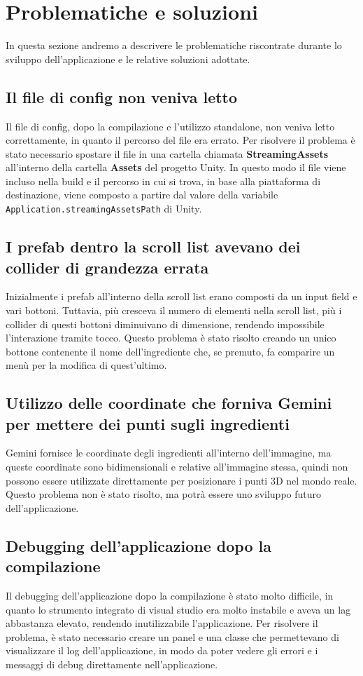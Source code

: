 \section{Problematiche e soluzioni}
In questa sezione andremo a descrivere le problematiche riscontrate durante lo sviluppo dell'applicazione e le relative soluzioni adottate.
\subsection{Il file di config non veniva letto}
Il file di config, dopo la compilazione e l'utilizzo standalone, non veniva letto correttamente, in quanto il percorso del file era errato. Per risolvere il problema è stato necessario spostare il file in una cartella chiamata \textbf{StreamingAssets} all'interno della cartella \textbf{Assets} del progetto Unity. In questo modo il file viene incluso nella build e il percorso in cui si trova, in base alla piattaforma di destinazione, viene composto a partire dal valore della variabile \texttt{Application.streamingAssetsPath} di Unity.

\subsection{I prefab dentro la scroll list avevano dei collider di grandezza errata}
Inizialmente i prefab all'interno della scroll list erano composti da un input field e vari bottoni. Tuttavia, più cresceva il numero di elementi nella scroll list, più i collider di questi bottoni diminuivano di dimensione, rendendo impossibile l'interazione tramite tocco. Questo problema è stato risolto creando un unico bottone contenente il nome dell'ingrediente che, se premuto, fa comparire un menù per la modifica di quest'ultimo.
\subsection{Utilizzo delle coordinate che forniva Gemini per mettere dei punti sugli ingredienti}
Gemini fornisce le coordinate degli ingredienti all'interno dell'immagine, ma queste coordinate sono bidimensionali e relative all'immagine stessa, quindi non possono essere utilizzate direttamente per posizionare i punti 3D nel mondo reale. Questo problema non è stato risolto, ma potrà essere uno sviluppo futuro dell'applicazione.

\subsection{Debugging dell'applicazione dopo la compilazione}
Il debugging dell'applicazione dopo la compilazione è stato molto difficile, in quanto lo strumento integrato di visual studio era molto instabile e aveva un lag abbastanza elevato, rendendo inutilizzabile l'applicazione. Per risolvere il problema, è stato necessario creare un panel e una classe che permettevano di visualizzare il log dell'applicazione, in modo da poter vedere gli errori e i messaggi di debug direttamente nell'applicazione.